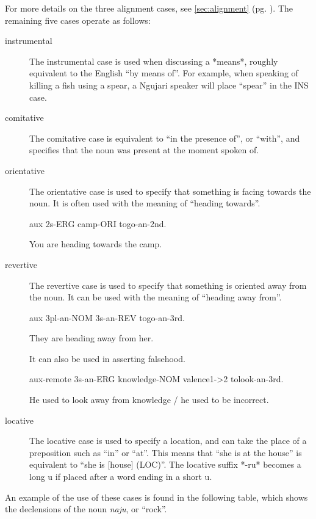 For more details on the three alignment cases, see \ref{sec:alignment} (pg.
\pageref{sec:alignment}). The remaining five cases operate as follows:

\begin{description}
\item[instrumental] The instrumental case is used when discussing a *means*,
  roughly equivalent to the English ``by means of''. For example, when speaking
  of killing a fish using a spear, a Ngujari speaker will place ``spear'' in the
  \textsc{INS} case.
\item[comitative] The comitative case is equivalent to ``in the presence of'',
  or ``with'', and specifies that the noun was present at the moment spoken of.
\item[orientative] The orientative case is used to specify that something is
  facing towards the noun. It is often used with the meaning of ``heading
  towards''.

  aux 2s-ERG camp-ORI togo-an-2nd.

  You are heading towards the camp.

\item[revertive] The revertive case is used to specify that something is
    oriented away from the noun. It can be used with the meaning of ``heading
    away from''.

  aux 3pl-an-NOM 3s-an-REV togo-an-3rd.

  They are heading away from her.

  It can also be used in asserting falsehood.

  aux-remote 3s-an-ERG knowledge-NOM valence1->2 tolook-an-3rd.

  He used to look away from knowledge / he used to be incorrect.

\item[locative] The locative case is used to specify a location, and can take
  the place of a preposition such as ``in'' or ``at''. This means that ``she is
  at the house'' is equivalent to ``she is [house] (\textsc{LOC})''. The
  locative suffix *-ru* becomes a long u if placed after a word ending in a
  short u.

\end{description}

An example of the use of these cases is found in the following table, which
shows the declensions of the noun \textit{naju}, or ``rock''.

